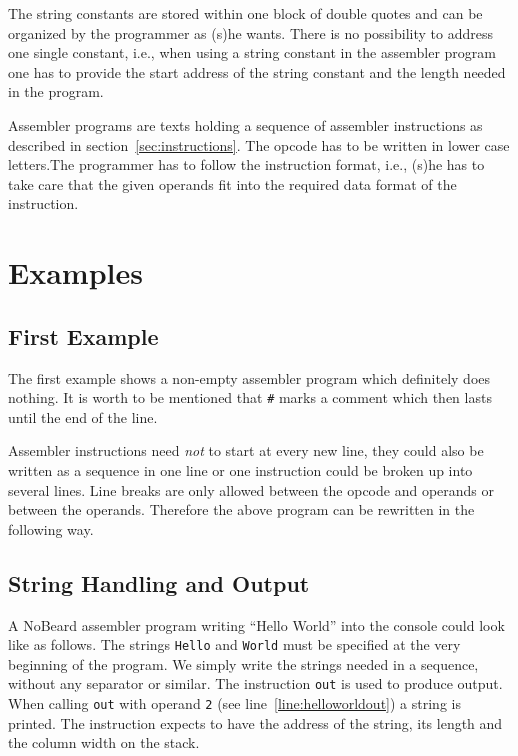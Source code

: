 \documentclass[11pt]{report}
\newcommand{\leongage}{NoBeard}
\begin{document}
The string constants are stored within one block of double quotes and can be organized by the programmer as (s)he wants. There is no possibility to address one single constant, i.e., when using a string constant in the assembler program one has to provide the start address of the string constant and the length needed in the program.

Assembler programs are texts holding a sequence of assembler instructions as described in section~\ref{sec:instructions}. The opcode has to be written in lower case letters.The programmer has to follow the instruction format, i.e., (s)he has to take care that the given operands fit into the required data format of the instruction.

\section{Examples}
\subsection{First Example}
The first example shows a non-empty assembler program which definitely does nothing. It is worth to be mentioned that \lstinline$#$ marks a comment which then lasts until the end of the line. 
\newcommand{\assemblerfilepath}{../../SamplePrograms/NbAssemblerPrograms/}
\lstset{language=NoBeardAsm}


Assembler instructions need {\em not} to start at every new line, they could also be written as a sequence in one line or one instruction could be broken up into several lines. Line breaks are only allowed between the opcode and operands or between the operands. Therefore the above program can be rewritten in the following way.


\subsection{String Handling and Output}
A \leongage{} assembler program writing ``Hello World'' into the console could look like as follows. The strings \lstinline$Hello$ and \lstinline$World$ must be specified at the very beginning of the program. We simply write the strings needed in a sequence, without any separator or similar. The instruction \lstinline$out$ is used to produce output. When calling \lstinline$out$ with operand \lstinline$2$ (see line~\ref{line:helloworldout}) a string is printed. The instruction expects to have the address of the string, its length and the column width on the stack.
\end{document}
